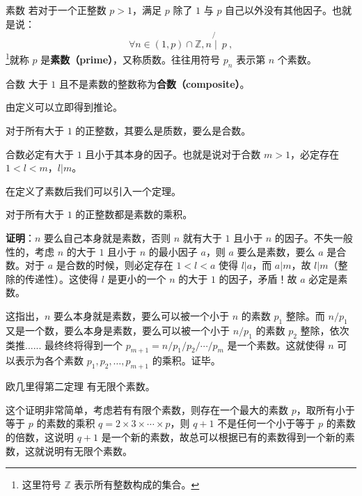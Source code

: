 
\begin{definition}{素数}
若对于一个正整数 $p > 1$，满足 $p$ 除了 $1$ 与 $p$ 自己以外没有其他因子。也就是说：
\begin{equation}
\forall n \in (1,p) \cap \mathbb Z, n \not{\mid} ~ p ~,
\end{equation}
\footnote{这里符号 $\mathbb Z$ 表示所有整数构成的集合。}就称 $p$ 是\textbf{素数（prime）}，又称质数。往往用符号 $p_n$ 表示第 $n$ 个素数。
\end{definition}

\begin{definition}{合数}
大于 $1$ 且不是素数的整数称为\textbf{合数（composite）}。
\end{definition}

由定义可以立即得到推论。
\begin{corollary}{}
对于所有大于 $1$ 的正整数，其要么是质数，要么是合数。
\end{corollary}
\begin{corollary}{}
合数必定有大于 $1$ 且小于其本身的因子。也就是说对于合数 $m > 1$，必定存在 $1 < l < m$，$l | m$。
\end{corollary}



在定义了素数后我们可以引入一个定理。
\begin{theorem}{}\label{the_prmnt_1}
对于所有大于 $1$ 的正整数都是素数的乘积。
\end{theorem}
\textbf{证明}：$n$ 要么自己本身就是素数，否则 $n$ 就有大于 $1$ 且小于 $n$ 的因子。不失一般性的，考虑 $n$ 的大于 $1$ 且小于 $n$ 的最小因子 $a$，则 $a$ 要么是素数，要么 $a$ 是合数。对于 $a$ 是合数的时候，则必定存在 $1 < l < a$ 使得 $l | a$，而 $a | m$，故 $l|m$（整除的传递性）。这使得 $l$ 是更小的一个 $n$ 的大于 $1$ 的因子，矛盾！故 $a$ 必定是素数。

这指出，$n$ 要么本身就是素数，要么可以被一个小于 $n$ 的素数 $p_1$ 整除。而 $n / p_1$ 又是一个数，要么本身是素数，要么可以被一个小于 $n / p_1$ 的素数 $p_2$ 整除，依次类推...... 最终终将得到一个 $p_{m+1} = n/ p_1 / p_2 / \cdots / p_m$ 是一个素数。这就使得 $n$ 可以表示为各个素数 $p_1, p_2, \dots, p_{m+1}$ 的乘积。证毕。

\begin{theorem}{欧几里得第二定理}
有无限个素数。
\end{theorem}
这个证明非常简单，考虑若有有限个素数，则存在一个最大的素数 $p$，取所有小于等于 $p$ 的素数的乘积 $q = 2 \times 3 \times \cdots \times p$，则 $q+1$ 不是任何一个小于等于 $p$ 的素数的倍数，这说明 $q+1$ 是一个新的素数，故总可以根据已有的素数得到一个新的素数，这就说明有无限个素数。

